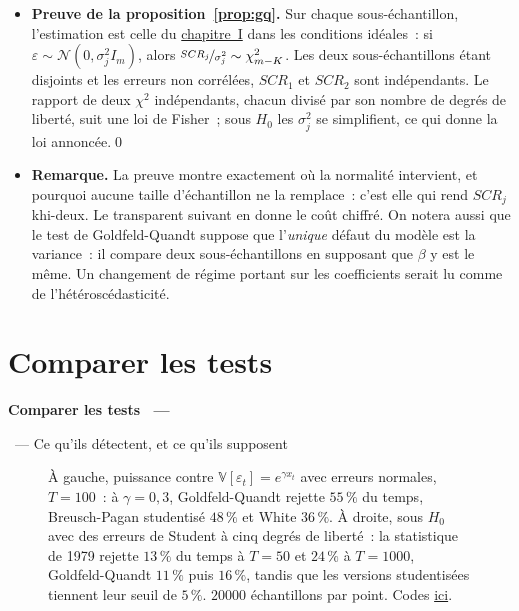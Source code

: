 \documentclass[10pt,a4paper]{article}
\makeatletter
\newcommand{\coursfile}{chapitre-4}
\newcommand{\HEAD}{HEAD}%
\newcommand{\repourl}{https://github.com/stepan-a/econometrics}
\newcommand{\siteurl}{https://le-mans.adjemian.eu/econometrics}
\newcommand{\chapref}[2]{\href{\siteurl/chapitre-#1.pdf}{chapitre~#2}}
\newcommand{\normal}[2]{\mathcal N\left(#1,#2\right)}
\newcommand{\coderef}[1]{\href{\repourl/blob/\HEAD/routines/\coursfile/#1}{ici}}
\theoremstyle{definition}
\renewcommand{\newline}{\unskip\par\vspace{1.5pt}}
\newenvironment{frame}[1][]{\par}{\par}
\newcommand{\frameheadrule}{%
  \par\nobreak\vspace{1pt}{\color{ctitle}\hrule height 0.6pt}\nobreak\vspace{4pt}}
\newcommand{\frametitle}[1]{%
  \par\addvspace{8pt plus 2pt}\needspace{6\baselineskip}%
  \noindent\begingroup\color{ctitle}\sffamily\bfseries\large #1\endgroup
  \@ifnextchar\framesubtitle{}{\frameheadrule}}
\newcommand{\framesubtitle}[1]{%
  \begingroup\color{ctitle}\sffamily\normalsize\ --- #1\endgroup\frameheadrule}
\makeatother
\begin{document}
\begin{notes}

  \begin{itemize}

  \item \textbf{Preuve de la proposition~\ref{prop:gq}.} Sur chaque
    sous-échantillon, l'estimation est celle du \chapref{1}{I} dans les
    conditions idéales~: si $\varepsilon\sim\normal{0}{\sigma_j^2I_m}$, alors
    $\nicefrac{SCR_j}{\sigma_j^2}\sim\chi^2_{m-K}$. Les deux sous-échantillons
    étant disjoints et les erreurs non corrélées, $SCR_1$ et $SCR_2$ sont
    indépendants. Le rapport de deux $\chi^2$ indépendants, chacun divisé par
    son nombre de degrés de liberté, suit une loi de Fisher~; sous $H_0$ les
    $\sigma_j^2$ se simplifient, ce qui donne la loi annoncée.\qed\newline

  \item \textbf{Remarque.} La preuve montre exactement où la normalité
    intervient, et pourquoi aucune taille d'échantillon ne la remplace~: c'est
    elle qui rend $SCR_j$ khi-deux. Le transparent suivant en donne le coût
    chiffré. On notera aussi que le test de Goldfeld-Quandt suppose que
    l'\emph{unique} défaut du modèle est la variance~: il compare deux
    sous-échantillons en supposant que $\beta$ y est le même. Un changement de
    régime portant sur les coefficients serait lu comme de
    l'hétéroscédasticité.

  \end{itemize}

\end{notes}


\section{Comparer les tests}

\begin{frame}[c]
  \frametitle{Comparer les tests}
  \framesubtitle{Ce qu'ils détectent, et ce qu'ils supposent}

  \begin{figure}
    \centering
    \caption{À gauche, puissance contre $\mathbb V[\varepsilon_t]=e^{\gamma x_t}$
      avec erreurs normales, $T=100$~: à $\gamma=0{,}3$, Goldfeld-Quandt rejette
      $55\,\%$ du temps, Breusch-Pagan studentisé $48\,\%$ et White $36\,\%$. À
      droite, sous $H_0$ avec des erreurs de Student à cinq degrés de liberté~:
      la statistique de 1979 rejette $13\,\%$ du temps à $T=50$ et $24\,\%$ à
      $T=1000$, Goldfeld-Quandt $11\,\%$ puis $16\,\%$, tandis que les versions
      studentisées tiennent leur seuil de $5\,\%$. $20000$ échantillons par
      point. Codes \coderef{puissance-tests.py}.}
  \end{figure}

\end{frame}
\end{document}
